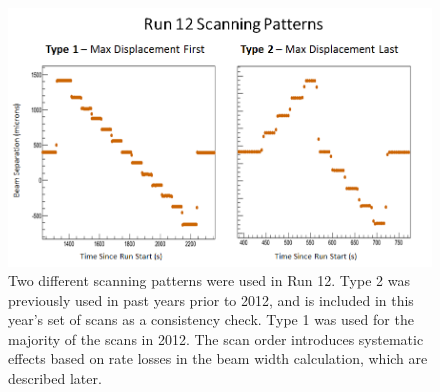 \begin{figure}
\begin{center}
\includegraphics[width=0.75\linewidth]{./figures/scan_patterns}
\caption{ Two different scanning patterns were used in Run 12. Type 2 was previously
used in past years prior to 2012, and is included in this year's set of scans as a consistency check.
Type 1 was used for the majority of the scans in 2012. The scan order introduces
systematic effects based on rate losses in the beam width calculation, which are described
later.}
\label{fig:scan_patterns}
\end{center}
\end{figure}
